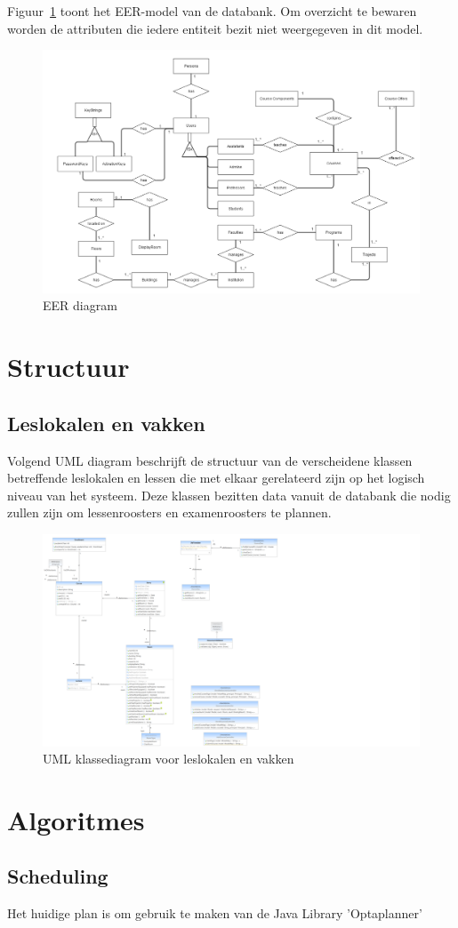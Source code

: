 Figuur~\ref{fig:EER diagram} toont het EER-model van de databank. Om overzicht te bewaren worden de attributen die iedere entiteit bezit niet weergegeven in dit model.

\begin{figure}[H]
	\centering
	\includegraphics[scale=0.4]{img/ER2-gliffy}
	\caption{EER diagram}
	\label{fig:EER diagram}
\end{figure}

\section{Structuur}
\subsection{Leslokalen en vakken}
Volgend UML diagram beschrijft de structuur van de verscheidene klassen betreffende leslokalen en lessen die met elkaar gerelateerd zijn op het logisch niveau van het systeem.
Deze klassen bezitten data vanuit de databank die nodig zullen zijn om lessenroosters en examenroosters te plannen.

\begin{figure}[H]
	\centering
	\includegraphics[scale=0.2]{img/roomsAndCourses}
	\caption{UML klassediagram voor leslokalen en vakken}
	\label{fig:roomsAndCourses}
\end{figure}

\section{Algoritmes}
\subsection{Scheduling}
Het huidige plan is om gebruik te maken van de Java Library 'Optaplanner'